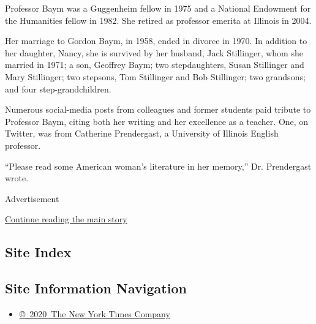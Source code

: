 Professor Baym was a Guggenheim fellow in 1975 and a National Endowment
for the Humanities fellow in 1982. She retired as professor emerita at
Illinois in 2004.

Her marriage to Gordon Baym, in 1958, ended in divorce in 1970. In
addition to her daughter, Nancy, she is survived by her husband, Jack
Stillinger, whom she married in 1971; a son, Geoffrey Baym; two
stepdaughters, Susan Stillinger and Mary Stillinger; two stepsons, Tom
Stillinger and Bob Stillinger; two grandsons; and four
step-grandchildren.

Numerous social-media posts from colleagues and former students paid
tribute to Professor Baym, citing both her writing and her excellence as
a teacher. One, on Twitter, was from Catherine Prendergast, a University
of Illinois English professor.

``Please read some American woman's literature in her memory,'' Dr.
Prendergast wrote.

Advertisement

\protect\hyperlink{after-bottom}{Continue reading the main story}

\hypertarget{site-index}{%
\subsection{Site Index}\label{site-index}}

\hypertarget{site-information-navigation}{%
\subsection{Site Information
Navigation}\label{site-information-navigation}}

\begin{itemize}
\tightlist
\item
  \href{https://help.nytimes3xbfgragh.onion/hc/en-us/articles/115014792127-Copyright-notice}{©~2020~The
  New York Times Company}
\end{itemize}

